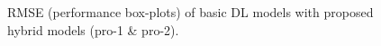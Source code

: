 \documentclass[a4paper, fleqn]{cas-sc}
\begin{document}
\begin{figure}[h!]
    \caption{RMSE (performance box-plots) of basic DL models with proposed hybrid models (pro-1 \& pro-2).}
    \label{Fig:14}
  \end{figure}
\end{document}
